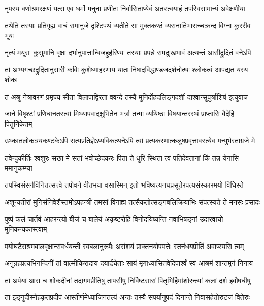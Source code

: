 \twolineshloka
{नृपस्य वर्णाश्रमरक्षणं यत्स एव धर्मो मनुना प्रणीतः}
{निर्वासिताप्येवं अतस्त्वयाहं तपस्विसामान्यं अवेक्षणीया}%

\twolineshloka
{तथेति तस्याः प्रतिगृह्य वाचं रामानुजे दृश्टिपथं व्यतीते}
{सा मुक्तकण्ठं व्यसनातिभाराच्चक्रन्द विग्ना कुररीव भूयः}%

\twolineshloka
{नृत्यं मयूराः कुसुमानि वृक्षा दर्भानुपात्तान्विजहुर्हरिण्यः}
{तस्याः प्रपन्ने समदुःखभावं अत्यन्तं आसीद्रुदितं वनेऽपि}%

\twolineshloka
{तां अभ्यगच्छद्रुदितानुसारी कविः कुशेध्माहरणाय यातः}
{निषादविद्धाण्डजदर्शनोत्थः श्लोकत्वं आपद्यत यस्य शोकः}%

\twolineshloka
{तं अश्रु नेत्रावरणं प्रमृज्य सीता विलापाद्विरता ववन्दे}
{तस्यै मुनिर्दोहदलिङ्गदर्शी दाश्वान्सुपुर्त्राशिषं इत्युवाच}%

\twolineshloka
{जाने विषृश्टां प्रणिधानतस्त्वां मिथ्यापवादक्षुभितेन भर्त्रा}
{तन्मा व्यथिष्ठा विषयान्तरस्थं प्राप्तासि वैदेहि पितुर्निकेतम्}%

\twolineshloka
{उथ्कातलोकत्रयकण्टकेऽपि सत्यप्रतिज्ञेऽप्यविकत्थनेऽपि}
{त्वां प्रत्यकस्मात्कलुषप्रवृत्तावस्त्येव मन्युर्भरताग्रजे मे}%

\twolineshloka
{तवेन्दुकीर्तिः श्वशुरः सखा मे सतां भवोच्छेदकरः पिता ते}
{धुरि स्थिता त्वं पतिदेवतानां किं तन्न येनासि ममानुकम्प्या}%

\twolineshloka
{तपस्विसंसर्गविनितत्सत्त्वे तपोवने वीतभया वसास्मिन्}
{इतो भविष्यत्यनघप्रसूतेरपत्यसंस्कारमयो विधिस्ते}%

\twolineshloka
{अशून्यतीरां मुनिसंनिवेशैस्तमोऽपहन्त्रीं तमसां विगाह्य}
{तत्सैकतोत्सङ्गबलिक्रियाभिः संपत्स्यते ते मनसः प्रसादः}%

\twolineshloka
{पुष्पं फलं चार्तवं आहरन्त्यो बीजं च बालेयं अकृष्टरोहि}
{विनोदयिष्यन्ति नवाभिषङ्गां उदारवाचो मुनिकन्यकास्त्वाम्}%

\twolineshloka
{पयोघटैराश्रमबालवृक्षान्संवर्धयन्ती स्वबलानुरूपैः}
{असंशयं प्राक्तनयोपपत्तेः स्तनंधयप्रीतिं अवाप्स्यसि त्वम्}%

\twolineshloka
{अनुग्रहप्रत्यभिनन्दिनीं तां वाल्मीकिरादाय दयार्द्रचेताः}
{सायं मृगाध्यासितवेदिपार्श्वं स्वं आश्रमं शान्तमृगं निनाय}%

\twolineshloka
{तां अर्पयां आस च शोकदीनां तदागमप्रीतिषु तापसीषु}
{निर्विष्टसारां पितृभिर्हिमांशोरन्त्यां कलां दर्श इवौषधीषु}%

\twolineshloka
{ता इङ्गुदीस्नेहकृतप्रदीपं आस्तीर्णमेध्याजिनतल्पं अन्तः}
{तस्यै सपर्यानुपदं दिनान्ते निवासहेतोरुटजं वितेरुः}%

